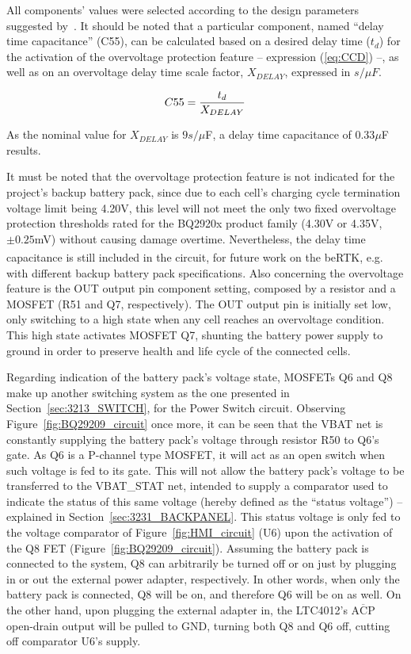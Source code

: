 All components' values were selected according to the design parameters suggested by~\cite{bq29209}. It should be noted that a particular component, named ``delay time capacitance'' (C55), can be calculated based on a desired delay time ($t_d$) for the activation of the overvoltage protection feature -- expression (\ref{eq:CCD}) --, as well as on an overvoltage delay time scale factor, $X_{DELAY}$, expressed in $s/ \mu F$.

\begin{equation}\label{eq:CCD}
	C55=\frac{t_d}{X_{DELAY}}\,\medskip
\end{equation}

\noindent As the nominal value for $X_{DELAY}$ is $9s/ \mu$F, a delay time capacitance of $0.33 \mu$F results.

It must be noted that the overvoltage protection feature is not indicated for the project's backup battery pack, since due to each cell's charging cycle termination voltage limit being 4.20V, this level will not meet the only two fixed overvoltage protection thresholds rated for the BQ2920x product family (4.30V or 4.35V, $\pm 0.25$mV) without causing damage overtime. Nevertheless, the delay time capacitance is still included in the circuit, for future work on the beRTK\textsuperscript{\textregistered}, e.g. with different backup battery pack specifications. Also concerning the overvoltage feature is the OUT output pin component setting, composed by a resistor and a MOSFET (R51 and Q7, respectively). The OUT output pin is initially set low, only switching to a high state when any cell reaches an overvoltage condition. This high state activates MOSFET Q7, shunting the battery power supply to ground in order to preserve health and life cycle of the connected cells.

Regarding indication of the battery pack's voltage state, MOSFETs Q6 and Q8 make up another switching system as the one presented in Section~\ref{sec:3213_SWITCH}, for the Power Switch circuit. Observing Figure~\ref{fig:BQ29209_circuit} once more, it can be seen that the VBAT net is constantly supplying the battery pack's voltage through resistor R50 to Q6's gate. As Q6 is a P-channel type MOSFET, it will act as an open switch when such voltage is fed to its gate. This will not allow the battery pack's voltage to be transferred to the VBAT\_STAT net, intended to supply a comparator used to indicate the status of this same voltage (hereby defined as the ``status voltage'') -- explained in Section~\ref{sec:3231_BACKPANEL}. This status voltage is only fed to the voltage comparator of Figure~\ref{fig:HMI_circuit} (U6) upon the activation of the Q8 FET (Figure~\ref{fig:BQ29209_circuit}). Assuming the battery pack is connected to the system, Q8 can arbitrarily be turned off or on just by plugging in or out the external power adapter, respectively. In other words, when only the battery pack is connected, Q8 will be on, and therefore Q6 will be on as well. On the other hand, upon plugging the external adapter in, the LTC4012's $\overline{\mbox{ACP}}$ open-drain output will be pulled to GND, turning both Q8 and Q6 off, cutting off comparator U6's supply.

